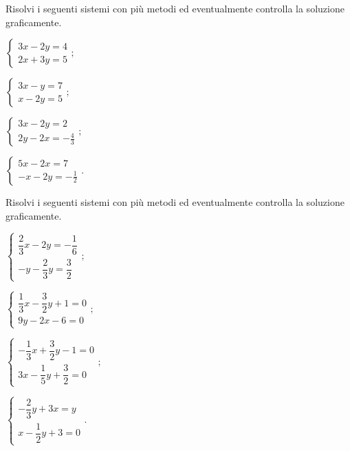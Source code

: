 \begin{esercizio}[\Ast]
 \label{ese:22.69}
 Risolvi i seguenti sistemi con più metodi ed eventualmente controlla
la soluzione graficamente.
\begin{multicols}{2}
\begin{enumeratea}
\item $\left\{\begin{array}{l}3x-2y=4 \\2x+3y=5\end{array}\right.;$
\item $\left\{\begin{array}{l}3x-y=7 \\x-2y=5 \end{array}\right.;$
\item $\left\{\begin{array}{l}3x-2y=2\\2y-2x=-{\frac{4}{3}} \end{array}\right.;$
\item $\left\{\begin{array}{l}5x-2x=7\\-x-2y=-{\frac{1}{2}} \end{array}\right..$
\end{enumeratea}
\end{multicols}
\end{esercizio}

\begin{esercizio}[\Ast]
 \label{ese:22.70}
 Risolvi i seguenti sistemi con più metodi ed eventualmente controlla
la soluzione graficamente.
\begin{multicols}{2}
\begin{enumeratea}
{\longarray
\item $\left\{\begin{array}{l}\dfrac{2}{3}x-2y=-{\dfrac{1}{6}}\\-y-\dfrac{2}{3}y=\dfrac{3}{2} \end{array}\right.;$
\item $\left\{\begin{array}{l}\dfrac{1}{3}x-\dfrac{3}{2}y+1=0\\9y-2x-6=0 \end{array}\right.;$
\item $\left\{\begin{array}{l}-{\dfrac{1}{3}}x+\dfrac{3}{2}y-1=0\\3x-\dfrac{1}{5}y+\dfrac{3}{2}=0 \end{array}\right.;$
\item $\left\{\begin{array}{l}-{\dfrac{2}{3}}y+3x=y\\x-\dfrac{1}{2}y+3=0 \end{array}\right..$}
\end{enumeratea}
\end{multicols}
\end{esercizio}

